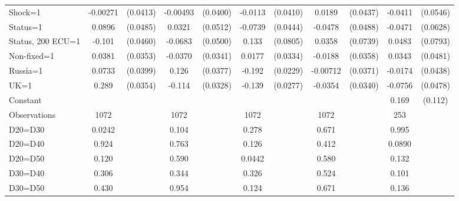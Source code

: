 \begin{tabular}{l|cccccccc|cc}
Shock=1         & -0.00271         & (0.0413)& -0.00493         & (0.0400)&  -0.0113         & (0.0410)&   0.0189         & (0.0437)&  -0.0411         & (0.0546)\\
Status=1        &   0.0896\sym{*}  & (0.0485)&   0.0321         & (0.0512)&  -0.0739\sym{*}  & (0.0444)&  -0.0478         & (0.0488)&  -0.0471         & (0.0628)\\
Status, 200 ECU=1&   -0.101\sym{**} & (0.0460)&  -0.0683         & (0.0500)&    0.133\sym{*}  & (0.0805)&   0.0358         & (0.0739)&   0.0483         & (0.0793)\\
Non-fixed=1     &   0.0381         & (0.0353)&  -0.0370         & (0.0341)&   0.0177         & (0.0334)&  -0.0188         & (0.0358)&   0.0343         & (0.0481)\\
Russia=1        &   0.0733\sym{*}  & (0.0399)&    0.126\sym{***}& (0.0377)&   -0.192\sym{***}& (0.0229)& -0.00712         & (0.0371)&  -0.0174         & (0.0438)\\
UK=1            &    0.289\sym{***}& (0.0354)&   -0.114\sym{***}& (0.0328)&   -0.139\sym{***}& (0.0277)&  -0.0354         & (0.0340)&  -0.0756         & (0.0478)\\
Constant        &                  &         &                  &         &                  &         &                  &         &    0.169         &  (0.112)\\
\hline
Observations    &     1072         &         &     1072         &         &     1072         &         &     1072         &         &      253         &         \\
D20=D30         &   0.0242         &         &    0.104         &         &    0.278         &         &    0.671         &         &    0.995         &         \\
D20=D40         &    0.924         &         &    0.763         &         &    0.126         &         &    0.412         &         &   0.0890         &         \\
D20=D50         &    0.120         &         &    0.590         &         &   0.0442         &         &    0.580         &         &    0.132         &         \\
D30=D40         &    0.306         &         &    0.344         &         &    0.326         &         &    0.524         &         &    0.101         &         \\
D30=D50         &    0.430         &         &    0.954         &         &    0.124         &         &    0.671         &         &    0.136         &         \\

\end{tabular}
